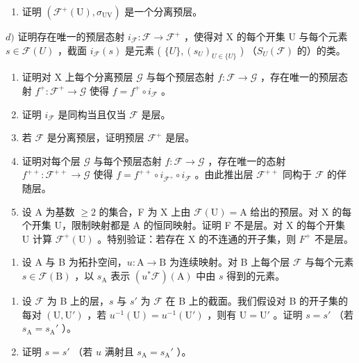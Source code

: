 \begin{enumerate}
\def\labelenumi{\alph{enumi})}
\setcounter{enumi}{2}
\tightlist
\item
  证明 \((\mathcal{F}^{+}(\mathrm{U}),\sigma_{\mathrm{UV}})\) 是一个分离预层。
\end{enumerate}

\(d)\) 证明存在唯一的预层态射 \(i_{\mathcal{F}}: \mathcal{F} \to \mathcal{F}^{+}\) ，使得对 X 的每个开集 U 与每个元素 \(s \in \mathcal{F}(U)\) ，截面 \(i_{\mathcal{F}}(s)\) 是元素 ( \(\{U\}, (s_U)_{U \in \{U\}}\) ) （\(S_U(\mathcal{F})\) 的）的类。

\begin{enumerate}
\def\labelenumi{\alph{enumi})}
\setcounter{enumi}{4}
\item
  证明对 X 上每个分离预层 \(\mathcal{G}\) 与每个预层态射 \(f\colon \mathcal{F} \to \mathcal{G}\) ，存在唯一的预层态射 \(f^{+}\colon \mathcal{F}^{+} \to \mathcal{G}\) 使得 \(f = f^{+} \circ i_{\mathcal{F}}\) 。
\item
  证明 \(i_{\mathcal{F}}\) 是同构当且仅当 \(\mathcal{F}\) 是层。
\item
  若 \(\mathcal{F}\) 是分离预层，证明预层 \(\mathcal{F}^{+}\) 是层。
\item
  证明对每个层 \(\mathcal{G}\) 与每个预层态射 \(f\colon \mathcal{F}\to \mathcal{G}\) ，存在唯一的态射 \(f^{++}\colon \mathcal{F}^{++}\to \mathcal{G}\) 使得 \(f = f^{++}\circ i_{\mathcal{F}^+}\circ i_{\mathcal{F}}\) 。由此推出层 \(\mathcal{F}^{++}\) 同构于 \(\mathcal{F}\) 的伴随层。
\item
  设 A 为基数 \(\geqslant2\) 的集合，F 为 X 上由 \(\mathcal{F}(\mathrm{U})=\mathrm{A}\) 给出的预层。对 X 的每个开集 U，限制映射都是 A 的恒同映射。证明 F 不是层。对 X 的每个开集 U 计算 \(\mathcal{F}^{+}(\mathrm{U})\) 。特别验证：若存在 X 的不连通的开子集，则 \(F^{+}\) 不是层。
\end{enumerate}

\begin{enumerate}
\def\labelenumi{\arabic{enumi})}
\setcounter{enumi}{4}
\tightlist
\item
  设 A 与 B 为拓扑空间，\(u\colon\mathrm{A}\to\mathrm{B}\) 为连续映射。对 B 上每个层 \(\mathcal{F}\) 与每个元素 \(s\in\mathcal{F}(\mathrm{B})\) ，以 \(s_{\mathrm{A}}\) 表示 \((u^{*}\mathcal{F})(\mathrm{A})\) 中由 \(s\) 得到的元素。
\end{enumerate}

\begin{enumerate}
\def\labelenumi{\alph{enumi})}
\item
  设 \(\mathcal{F}\) 为 B 上的层，\(s\) 与 \(s'\) 为 \(\mathcal{F}\) 在 B 上的截面。我们假设对 B 的开子集的每对 \((\mathrm{U},\mathrm{U}')\) ，若 \(u^{-1}(\mathrm{U}) = u^{-1}(\mathrm{U}')\) ，则有 \(\mathrm{U} = \mathrm{U}'\) 。证明 \(s = s'\) （若 \(s_{\mathrm{A}} = s_{\mathrm{A}}'\) ）。
\item
  证明 \(s = s'\) （若 \(u\) 满射且 \(s_{\mathrm{A}} = s_{\mathrm{A}}'\) ）。
\end{enumerate}

